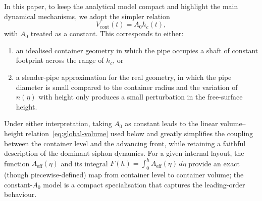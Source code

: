 \documentclass[11pt]{article}
\begin{document}
In this paper, to keep the analytical model compact and highlight the main dynamical
mechanisms, we adopt the simpler relation
\[
  V_{\text{cont}}(t) = A_0 h_c(t),
\]
with $A_0$ treated as a constant. This corresponds to either:
\begin{enumerate}
  \item an idealised container geometry in which the pipe occupies a shaft of constant footprint
        across the range of $h_c$, or
  \item a slender-pipe approximation for the real geometry, in which the pipe diameter is small
        compared to the container radius and the variation of $n(\eta)$ with height only
        produces a small perturbation in the free-surface height.
\end{enumerate}
Under either interpretation, taking $A_0$ as constant leads to the linear volume--height
relation~\eqref{eq:global-volume} used below and greatly simplifies the coupling between the container level and the
advancing front, while retaining a faithful description of the dominant siphon dynamics.
For a given internal layout, the function $A_{\text{eff}}(\eta)$ and its integral
$F(h)=\int_0^{h}A_{\text{eff}}(\eta)\,d\eta$ provide an exact (though piecewise-defined)
map from container level to container volume; the constant-$A_0$ model is a compact
specialisation that captures the leading-order behaviour.
\end{document}
